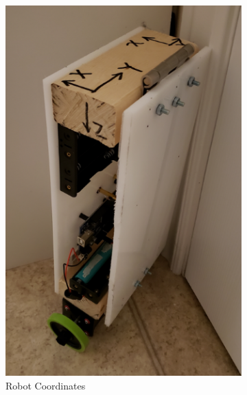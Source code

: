 \documentclass[12pt]{article}
\begin{document}
\begin{figure}

\begin{subfigure}{0.3\textwidth}
\includegraphics[width=\linewidth]{./figures/coordinates.png}
\caption{Robot Coordinates} \label{fig_coordinates}
\end{subfigure}
\hspace*{\fill} %
\begin{subfigure}{0.3\textwidth}

\end{subfigure}
\end{figure}
\end{document}
